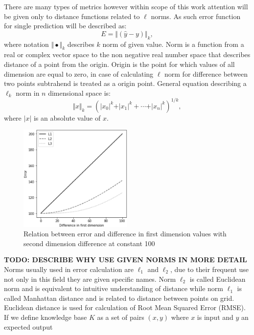 There are many types of metrics however within scope of this work attention will be given only to
distance functions related to $\ell$ norms.
As such error function for single prediction will be described as: 
\begin{equation}
	\label{equ:dist_norm}
	E = \Vert (\hat{y}-y) \Vert_{k},
\end{equation}
where notation $\Vert \bullet \Vert_{k}$ describes $k$ norm of given value.
Norm is a function from a real or complex vector space to the non negative real number space
that describes distance of a point from the origin.
Origin is the point for which values of all dimension are equal to zero, in case of calculating
$\ell$ norm for difference between two points subtrahend is treated as a origin point.
General equation describing a $\ell_{k}$ norm in $n$ dimensional space is:
\begin{equation}
	\label{equ:ell_norm}
	\Vert x \Vert_{k} = (\vert x_{0} \vert^{k} + \vert x_{1} \vert^{k} + \cdots +
	\vert x_{n} \vert^{k})^{1/k},
\end{equation}
where $\vert x \vert$ is an absolute value of $x$.
\begin{figure}[htb] 
	\label{fig:l_norms}
	\centering
	\includegraphics[width=0.5\textwidth]{figures/l_norms}
	\caption{Relation between error and difference in first dimension values with second 
	dimension difference at constant 100}
\end{figure}
\textbf{TODO: DESCRIBE WHY USE GIVEN NORMS IN MORE DETAIL}
Norms usually used in error calculation are $\ell_{1}$ and $\ell_{2}$, due to their frequent use
not only in this field they are given specific names.
Norm $\ell_{2}$ is called Euclidean norm and is equivalent to intuitive understanding of distance
while norm $\ell_{1}$ is called Manhattan distance and is related to distance between points on 
grid.
Euclidean distance is used for calculation of Root Mean Squared Error (RMSE). If we define 
knowledge base $K$ as a set of pairs $(x,y)$ where $x$ is input and $y$ an expected output
